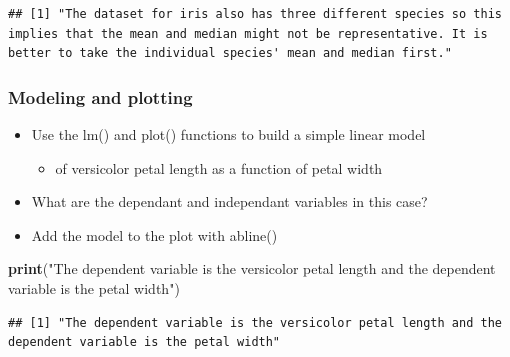 \documentclass[]{article}
\newenvironment{Shaded}{\begin{snugshade}}{\end{snugshade}}
\newcommand{\KeywordTok}[1]{\textcolor[rgb]{0.13,0.29,0.53}{\textbf{#1}}}
\newcommand{\NormalTok}[1]{#1}
\newcommand{\OperatorTok}[1]{\textcolor[rgb]{0.81,0.36,0.00}{\textbf{#1}}}
\newcommand{\StringTok}[1]{\textcolor[rgb]{0.31,0.60,0.02}{#1}}
\providecommand{\tightlist}{%
  \setlength{\itemsep}{0pt}\setlength{\parskip}{0pt}}
\begin{document}
\begin{verbatim}
## [1] "The dataset for iris also has three different species so this implies that the mean and median might not be representative. It is better to take the individual species' mean and median first."
\end{verbatim}

\hypertarget{modeling-and-plotting}{%
\subsubsection{Modeling and plotting}\label{modeling-and-plotting}}

\begin{itemize}
\tightlist
\item
  Use the lm() and plot() functions to build a simple linear model

  \begin{itemize}
  \tightlist
  \item
    of versicolor petal length as a function of petal width
  \end{itemize}
\item
  What are the dependant and independant variables in this case?
\item
  Add the model to the plot with abline()
\end{itemize}

\begin{Shaded}
\begin{Highlighting}[]
\KeywordTok{print}\NormalTok{(}\StringTok{"The dependent variable is the versicolor petal length and the dependent variable is the petal width"}\NormalTok{)}
\end{Highlighting}
\end{Shaded}

\begin{verbatim}
## [1] "The dependent variable is the versicolor petal length and the dependent variable is the petal width"
\end{verbatim}

\begin{Shaded}
\end{Shaded}
\end{document}
